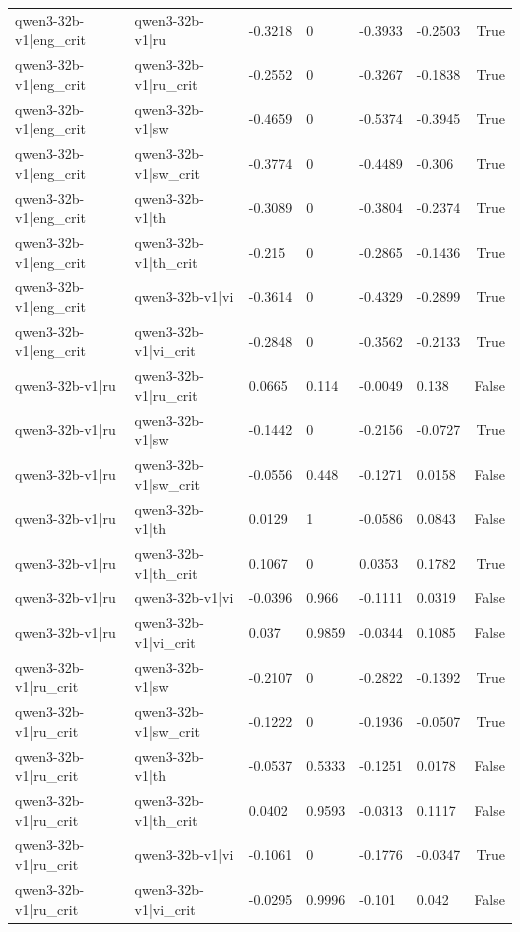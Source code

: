 \begin{table}
\begin{tabular}{llllllr}
qwen3-32b-v1|eng_crit & qwen3-32b-v1|ru & -0.3218 & 0 & -0.3933 & -0.2503 & True \\
qwen3-32b-v1|eng_crit & qwen3-32b-v1|ru_crit & -0.2552 & 0 & -0.3267 & -0.1838 & True \\
qwen3-32b-v1|eng_crit & qwen3-32b-v1|sw & -0.4659 & 0 & -0.5374 & -0.3945 & True \\
qwen3-32b-v1|eng_crit & qwen3-32b-v1|sw_crit & -0.3774 & 0 & -0.4489 & -0.306 & True \\
qwen3-32b-v1|eng_crit & qwen3-32b-v1|th & -0.3089 & 0 & -0.3804 & -0.2374 & True \\
qwen3-32b-v1|eng_crit & qwen3-32b-v1|th_crit & -0.215 & 0 & -0.2865 & -0.1436 & True \\
qwen3-32b-v1|eng_crit & qwen3-32b-v1|vi & -0.3614 & 0 & -0.4329 & -0.2899 & True \\
qwen3-32b-v1|eng_crit & qwen3-32b-v1|vi_crit & -0.2848 & 0 & -0.3562 & -0.2133 & True \\
qwen3-32b-v1|ru & qwen3-32b-v1|ru_crit & 0.0665 & 0.114 & -0.0049 & 0.138 & False \\
qwen3-32b-v1|ru & qwen3-32b-v1|sw & -0.1442 & 0 & -0.2156 & -0.0727 & True \\
qwen3-32b-v1|ru & qwen3-32b-v1|sw_crit & -0.0556 & 0.448 & -0.1271 & 0.0158 & False \\
qwen3-32b-v1|ru & qwen3-32b-v1|th & 0.0129 & 1 & -0.0586 & 0.0843 & False \\
qwen3-32b-v1|ru & qwen3-32b-v1|th_crit & 0.1067 & 0 & 0.0353 & 0.1782 & True \\
qwen3-32b-v1|ru & qwen3-32b-v1|vi & -0.0396 & 0.966 & -0.1111 & 0.0319 & False \\
qwen3-32b-v1|ru & qwen3-32b-v1|vi_crit & 0.037 & 0.9859 & -0.0344 & 0.1085 & False \\
qwen3-32b-v1|ru_crit & qwen3-32b-v1|sw & -0.2107 & 0 & -0.2822 & -0.1392 & True \\
qwen3-32b-v1|ru_crit & qwen3-32b-v1|sw_crit & -0.1222 & 0 & -0.1936 & -0.0507 & True \\
qwen3-32b-v1|ru_crit & qwen3-32b-v1|th & -0.0537 & 0.5333 & -0.1251 & 0.0178 & False \\
qwen3-32b-v1|ru_crit & qwen3-32b-v1|th_crit & 0.0402 & 0.9593 & -0.0313 & 0.1117 & False \\
qwen3-32b-v1|ru_crit & qwen3-32b-v1|vi & -0.1061 & 0 & -0.1776 & -0.0347 & True \\
qwen3-32b-v1|ru_crit & qwen3-32b-v1|vi_crit & -0.0295 & 0.9996 & -0.101 & 0.042 & False \\

\end{tabular}
\end{table}
